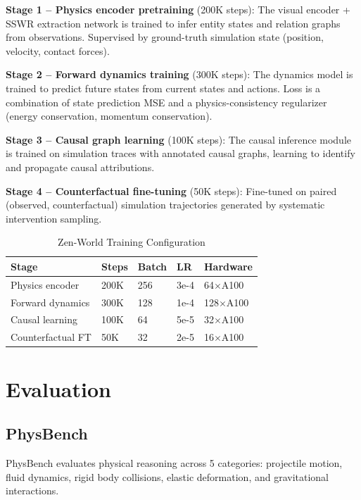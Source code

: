 \documentclass[11pt,a4paper]{article}
\begin{document}
\textbf{Stage 1 -- Physics encoder pretraining} (200K steps): The visual encoder + SSWR
extraction network is trained to infer entity states and relation graphs from observations.
Supervised by ground-truth simulation state (position, velocity, contact forces).

\textbf{Stage 2 -- Forward dynamics training} (300K steps): The dynamics model is trained to
predict future states from current states and actions. Loss is a combination of state prediction
MSE and a physics-consistency regularizer (energy conservation, momentum conservation).

\textbf{Stage 3 -- Causal graph learning} (100K steps): The causal inference module is trained
on simulation traces with annotated causal graphs, learning to identify and propagate causal
attributions.

\textbf{Stage 4 -- Counterfactual fine-tuning} (50K steps): Fine-tuned on paired
(observed, counterfactual) simulation trajectories generated by systematic intervention sampling.

\begin{table}[H]
\centering
\begin{tabular}{lllll}
\toprule
\textbf{Stage} & \textbf{Steps} & \textbf{Batch} & \textbf{LR} & \textbf{Hardware} \\
\midrule
Physics encoder & 200K & 256 & 3e-4 & 64$\times$A100 \\
Forward dynamics & 300K & 128 & 1e-4 & 128$\times$A100 \\
Causal learning & 100K & 64 & 5e-5 & 32$\times$A100 \\
Counterfactual FT & 50K & 32 & 2e-5 & 16$\times$A100 \\
\bottomrule
\end{tabular}
\caption{Zen-World Training Configuration}
\end{table}

\section{Evaluation}

\subsection{PhysBench}

PhysBench evaluates physical reasoning across 5 categories: projectile motion, fluid dynamics,
rigid body collisions, elastic deformation, and gravitational interactions.
\end{document}

